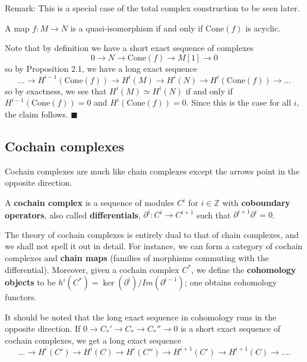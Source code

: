Remark:  This is a special case of the total complex construction to be seen later.

\begin{proposition} A map $f:M\rightarrow N$ is a quasi-isomorphism if and only if $\mathrm{Cone}(f)$ is acyclic.\end{proposition}

\begin{proposition}  Note that by definition we have a short exact sequence of complexes
$$0\rightarrow N\rightarrow \mathrm{Cone}(f)\rightarrow M[1]\rightarrow 0$$
so by Proposition 2.1, we have a long exact sequence
$$\dots \rightarrow H^{i-1}(\mathrm{Cone}(f))\rightarrow H^{i}(M)\rightarrow H^{i}(N)\rightarrow H^{i}(\mathrm{Cone}(f))\rightarrow\dots$$
so by exactness, we see that $H^i(M)\simeq H^i(N)$ if and only if $H^{i-1}(\mathrm{Cone}(f))=0$ and $H^i(\mathrm{Cone}(f))=0$.  Since this is the case for all $i$, the claim follows. $\blacksquare$
\end{proposition}



\subsection{Cochain complexes}
Cochain complexes are much like chain complexes except the
arrows point in the
opposite direction.

\begin{definition} A \textbf{cochain complex} is a sequence of modules
$C^i$ for $i \in \mathbb{Z}$ with \textbf{coboundary operators}, also
called
\textbf{differentials}, $\partial^i:C^i\rightarrow C^{i+1}$ such that
$\partial^{i+1}\partial^i=0$. \end{definition}

The theory of cochain complexes is entirely dual to that of chain complexes,
and we shall not spell it out in detail.
For instance, we can form a category of cochain complexes and
\textbf{chain maps} (families of morphisms commuting with the
differential). Moreover, given a cochain complex $C^*$, we
define the
\textbf{cohomology objects} to be
$h^i(C^*)=\ker(\partial^i)/Im(\partial^{i-1})$; one obtains cohomology
functors.

It should be noted that the long exact sequence in cohomology runs in the
opposite direction. 
If $0 \to C_*' \to C_* \to C_*'' \to 0$ is a short exact sequence of cochain
complexes, we get a long exact sequence
\[ \dots \to H^i(C' ) \to H^i(C) \to H^{i}(C'') \to H^{i+1}(C' ) \to H^{i+1}(C) \to
\dots.  \]


